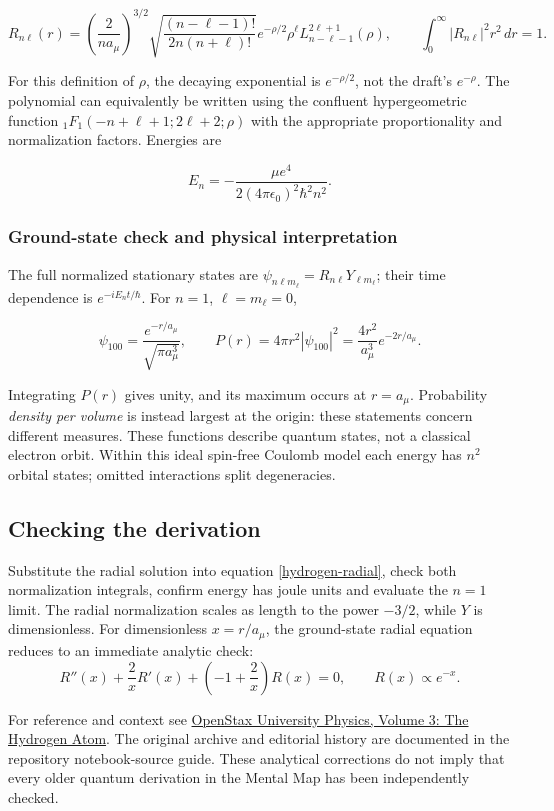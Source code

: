 \documentclass{article}
\begin{document}
\begin{equation}
R_{n\ell}(r)=\left(\frac{2}{na_\mu}\right)^{3/2}
\sqrt{\frac{(n-\ell-1)!}{2n(n+\ell)!}}
e^{-\rho/2}\rho^\ell L_{n-\ell-1}^{2\ell+1}(\rho),\qquad
\int_0^\infty |R_{n\ell}|^2r^2\,dr=1.
\label{hydrogen-normalization}
\end{equation}

For this definition of $\rho$, the decaying exponential is $e^{-\rho/2}$, not the draft's $e^{-\rho}$. The polynomial can equivalently be written using the confluent hypergeometric function ${}_1F_1(-n+\ell+1;2\ell+2;\rho)$ with the appropriate proportionality and normalization factors. Energies are

\begin{equation}
E_n=-\frac{\mu e^4}{2(4\pi\epsilon_0)^2\hbar^2 n^2}.
\label{hydrogen-energy}
\end{equation}

\subsubsection{Ground-state check and physical interpretation}
The full normalized stationary states are $\psi_{n\ell m_\ell}=R_{n\ell}Y_{\ell m_\ell}$; their time dependence is $e^{-iE_nt/\hbar}$. For $n=1$, $\ell=m_\ell=0$,

\begin{equation}
\psi_{100}=\frac{e^{-r/a_\mu}}{\sqrt{\pi a_\mu^3}},\qquad
P(r)=4\pi r^2|\psi_{100}|^2=\frac{4r^2}{a_\mu^3}e^{-2r/a_\mu}.
\label{hydrogen-ground-state}
\end{equation}

Integrating $P(r)$ gives unity, and its maximum occurs at $r=a_\mu$. Probability \emph{density per volume} is instead largest at the origin: these statements concern different measures. These functions describe quantum states, not a classical electron orbit. Within this ideal spin-free Coulomb model each energy has $n^2$ orbital states; omitted interactions split degeneracies.

\subsection{Checking the derivation}
Substitute the radial solution into equation \eqref{hydrogen-radial}, check both normalization integrals, confirm energy has joule units and evaluate the $n=1$ limit. The radial normalization scales as length to the power $-3/2$, while $Y$ is dimensionless. For dimensionless $x=r/a_\mu$, the ground-state radial equation reduces to an immediate analytic check:
\begin{equation}
R''(x)+\frac{2}{x}R'(x)+\left(-1+\frac{2}{x}\right)R(x)=0,
\qquad R(x)\propto e^{-x}.
\end{equation}

For reference and context see \href{https://openstax.org/books/university-physics-volume-3/pages/8-2-the-hydrogen-atom}{OpenStax University Physics, Volume 3: The Hydrogen Atom}. The original archive and editorial history are documented in the repository notebook-source guide. These analytical corrections do not imply that every older quantum derivation in the Mental Map has been independently checked.
\end{document}
